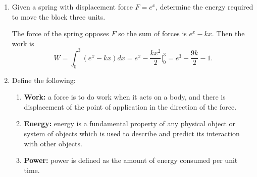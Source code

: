 \begin{enumerate}
\begin{enumerate}[label = (\alph*), ref = \theenumi{(\alph*)}]
    \par\smallskip
    Recall that for elastic collisions we can use the Conservation of Energy
    and Momentum.
    At \(t = 0\), the suspended bob has no potential energy, and the bob
    hanging at equilibrium has kinetic energy.
    Let the suspended bob have mass \(m_1\) and the bob hanging at
    equilibruim have mass \(m_2\).
    Then
    \begin{align*}
      m_1v_{1i} + m_2v_{2i} &= m_1v_{1f} + m_2v_{2f}\\
      m_1(v_{1i} - v_{2i}) &= m_2v_{2f}\eqnumtag\label{penmo}\\
      m_1v_{1i}^2 + m_2v_{2i}^2 &= m_1v_{1f}^2 + m_2v_{2f}^2\\
      m_1(v_{1i}^2 - v_{1f}^2) &= m_2v_{2f}^2\eqnumtag\label{penen}
    \end{align*}
    We can now divide \cref{penen} by \cref{penmo} and solve for the final
    velocities.
    \[
    v_{1i} + v_{1f} = v_{2f}
    \]
    From \cref{24a}, we have that the bobs initial velocity is
    \(v_{1i} = \sqrt{2gh}\).
    Thus, the final velocities are
    \begin{align*}
      v_{1f} &= v_{2f} - \sqrt{2gh}\\
      v_{2f} &= v_{1f} + \sqrt{2gh}
    \end{align*}
  \item
    What if the collision was non-elastic?
    \par\smallskip
    For inelastic collision, our Conservation equations become
    \begin{align*}
      m_1v_{1i} &= (m_1 + m_2)v_f\\
      m_1v_{1i}^2 &= (m_1 + m_2)v_f^2
    \end{align*}
    Then we have
    \[
    v_{1i} = v_f = \sqrt{2gh}.
    \]
  \end{enumerate}
\item
  Given a spring with displacement force \(F = e^x\), determine the energy
  required to move the block three units.
  \par\smallskip
  The force of the spring opposes \(F\) so the sum of forces is \(e^x - kx\).
  Then the work is
  \[
  W = \int_0^3(e^x - kx)dx = e^x - \frac{kx^2}{2}\big|_0^3
  = e^3 - \frac{9k}{2} - 1.
  \]
\item
  Define the following:
  \begin{enumerate}[label = (\alph*)]
  \item
    \textbf{Work:} a force is to do work when it acts on a body, and there is
    displacement of the point of application in the direction of the force.
  \item
    \textbf{Energy:} energy is a fundamental property of any physical object
    or system of objects which is used to describe and predict its interaction
    with other objects.
  \item
    \textbf{Power:} power is defined as the amount of energy consumed per unit
    time.
  \end{enumerate}
\end{enumerate}

